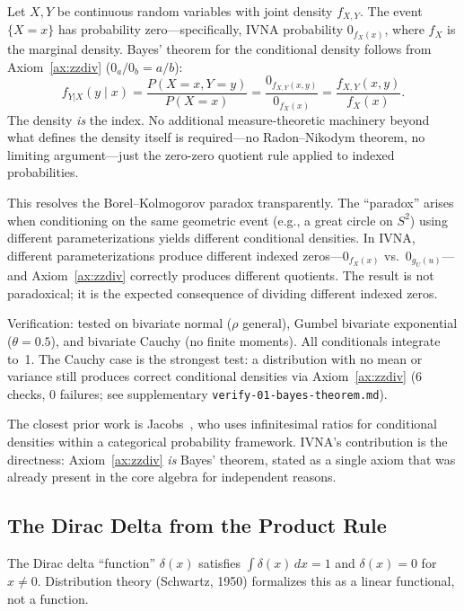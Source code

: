 \documentclass[12pt]{article}
\theoremstyle{definition}
\theoremstyle{remark}
\newcommand{\vz}[1]{0_{#1}}             %
\begin{document}
Let $X, Y$ be continuous random variables with joint density $f_{X,Y}$.
The event $\{X = x\}$ has probability zero---specifically, IVNA
probability $\vz{f_X(x)}$, where $f_X$ is the marginal density.
Bayes' theorem for the conditional density follows from
Axiom~\ref{ax:zzdiv} ($\vz{a}/\vz{b} = a/b$):
\[
f_{Y|X}(y \mid x) = \frac{P(X = x, Y = y)}{P(X = x)}
= \frac{\vz{f_{X,Y}(x,y)}}{\vz{f_X(x)}}
= \frac{f_{X,Y}(x,y)}{f_X(x)}.
\]
The density \emph{is} the index. No additional measure-theoretic
machinery beyond what defines the density itself is required---no
Radon--Nikodym theorem, no limiting argument---just the zero-zero
quotient rule applied to indexed probabilities.

This resolves the Borel--Kolmogorov paradox transparently. The
``paradox'' arises when conditioning on the same geometric event
(e.g., a great circle on $S^2$) using different parameterizations
yields different conditional densities. In IVNA, different
parameterizations produce different indexed zeros---$\vz{f_X(x)}$
vs.\ $\vz{g_U(u)}$---and Axiom~\ref{ax:zzdiv} correctly produces
different quotients. The result is not paradoxical; it is the expected
consequence of dividing different indexed zeros.

Verification: tested on bivariate normal ($\rho$ general),
Gumbel bivariate exponential ($\theta = 0.5$), and bivariate
Cauchy (no finite moments). All conditionals integrate to~1.
The Cauchy case is the strongest test: a distribution with no
mean or variance still produces correct conditional densities
via Axiom~\ref{ax:zzdiv} (6 checks, 0 failures; see supplementary
\texttt{verify-01-bayes-\allowbreak{}theorem.md}).

The closest prior work is Jacobs~\cite{jacobs2021}, who uses
infinitesimal ratios for conditional densities within a
categorical probability framework. IVNA's contribution is the
directness: Axiom~\ref{ax:zzdiv} \emph{is} Bayes' theorem, stated
as a single axiom that was already present in the core algebra for
independent reasons.

\subsection{The Dirac Delta from the Product Rule}
\label{subsec:dirac}

The Dirac delta ``function'' $\delta(x)$ satisfies $\int \delta(x)\,dx = 1$
and $\delta(x) = 0$ for $x \neq 0$. Distribution theory
(Schwartz, 1950) formalizes this as a linear functional, not a function.
\end{document}
